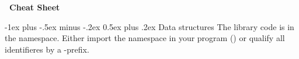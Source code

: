 \documentclass[10pt,landscape]{article}
\makeatletter
\renewcommand{\section}{\@startsection{section}{1}{0mm}%
                                {-1ex plus -.5ex minus -.2ex}%
                                {0.5ex plus .2ex}%
                                {\normalfont\large\bfseries}}
\makeatother
\begin{document}
\begin{multicols}{3}
\newcommand{\sdslwtblcd}{\code{wt\_blcd}}
\newcommand{\sdslwtint}{\code{wt\_int}}
\newcommand{\sdslwmint}{\code{wm\_int}}
\newcommand{\sdslwtgmr}{\code{wt\_gmr}}
\newcommand{\sdslwtap}{\code{wt\_ap}}
\newcommand{\sdslwtrlmn}{\code{wt\_rlmn}}
\newcommand{\sdslcsabitcompressed}{\code{csa\_bitcompressed}}
\newcommand{\sdslcsasada}{\code{csa\_sada}}
\newcommand{\sdslcsawt}{\code{csa\_wt}}
\newcommand{\sdslbytealphabetstrategy}{\code{byte\_alphabet}}
\newcommand{\sdslsuccinctbytealphabetstrategy}{\code{succinct\_byte\_alphabet}}
\newcommand{\sdslintalphabetstrategy}{\code{int\_alphabet}}
\newcommand{\sdslsaordersasampling}{\code{sa\_order\_sa\_sampling}}
\newcommand{\sdsltextordersasampling}{\code{text\_order\_sa\_sampling}}

\newcommand{\sdsllcpbitcompressed}{\code{lcp\_bitcompressed}}
\newcommand{\sdsllcpdac}{\code{lcp\_dac}}
\newcommand{\sdsllcpvlc}{\code{lcp\_vlc}}
\newcommand{\sdsllcpbyte}{\code{lcp\_byte}}
\newcommand{\sdsllcpsupportsada}{\code{lcp\_support\_sada}}
\newcommand{\sdsllcpwt}{\code{lcp\_wt}}
\newcommand{\sdsllcpsupporttree}{\code{lcp\_support\_tree}}
\newcommand{\sdsllcpsupporttreeII}{\code{lcp\_support\_tree2}}
\newcommand{\sdslbpsupportg}{\code{bp\_support\_g}}
\newcommand{\sdslbpsupportgg}{\code{bp\_support\_gg}}
\newcommand{\sdslbpsupportsada}{\code{bp\_support\_sada}}
\newcommand{\sdslcstsada}{\code{cst\_sada}}
\newcommand{\sdslcstsctIII}{\code{cst\_sct3}}
\newcommand{\sdslrmqsupportsparsetable}{\code{rmq\_support\_sparse\_table}}
\newcommand{\sdslrmqsuccinctsada}{\code{rmq\_succint\_sada}}
\newcommand{\sdslrmqsuccinctsct}{\code{rmq\_succint\_sct}}

\newcommand{\myYES}{$\checkmark$}
\newcommand{\myNO}{$\times$}

\begin{center}
     \Large{\textbf{\sdsl\ Cheat Sheet}} \\
\end{center}

\section{Data structures}
The library code is in the  namespace. Either import
the namespace in your program () or
qualify all identifieres by a -prefix.


\end{multicols}
\end{document}
